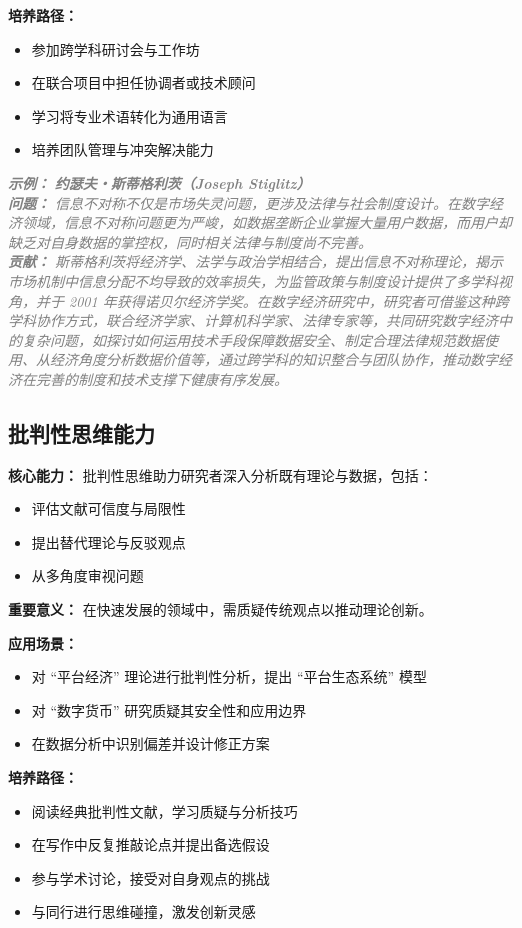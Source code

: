 \documentclass[lang=cn,12pt,a4paper]{elegantpaper}
\newcommand{\skillexample}[1]{\smallskip\noindent\textcolor{gray}{\textit{\footnotesize\textbf{示例：}} \textit{\footnotesize #1}}}
\begin{document}
\textbf {培养路径：}
\begin {itemize}
\item 参加跨学科研讨会与工作坊
\item 在联合项目中担任协调者或技术顾问
\item 学习将专业术语转化为通用语言
\item 培养团队管理与冲突解决能力
\end {itemize}

\skillexample {
\textbf {约瑟夫・斯蒂格利茨（Joseph Stiglitz）}\\
\textbf {问题：} 信息不对称不仅是市场失灵问题，更涉及法律与社会制度设计。在数字经济领域，信息不对称问题更为严峻，如数据垄断企业掌握大量用户数据，而用户却缺乏对自身数据的掌控权，同时相关法律与制度尚不完善。\\
\textbf {贡献：} 斯蒂格利茨将经济学、法学与政治学相结合，提出信息不对称理论，揭示市场机制中信息分配不均导致的效率损失，为监管政策与制度设计提供了多学科视角，并于 2001 年获得诺贝尔经济学奖。在数字经济研究中，研究者可借鉴这种跨学科协作方式，联合经济学家、计算机科学家、法律专家等，共同研究数字经济中的复杂问题，如探讨如何运用技术手段保障数据安全、制定合理法律规范数据使用、从经济角度分析数据价值等，通过跨学科的知识整合与团队协作，推动数字经济在完善的制度和技术支撑下健康有序发展。
}

\subsection {批判性思维能力}\label {sec:critical_thinking}
\textbf {核心能力：} 批判性思维助力研究者深入分析既有理论与数据，包括：
\begin {itemize}
\item 评估文献可信度与局限性
\item 提出替代理论与反驳观点
\item 从多角度审视问题
\end {itemize}

\textbf {重要意义：} 在快速发展的领域中，需质疑传统观点以推动理论创新。

\textbf {应用场景：}
\begin {itemize}
\item 对 “平台经济” 理论进行批判性分析，提出 “平台生态系统” 模型
\item 对 “数字货币” 研究质疑其安全性和应用边界
\item 在数据分析中识别偏差并设计修正方案
\end {itemize}

\textbf {培养路径：}
\begin {itemize}
\item 阅读经典批判性文献，学习质疑与分析技巧
\item 在写作中反复推敲论点并提出备选假设
\item 参与学术讨论，接受对自身观点的挑战
\item 与同行进行思维碰撞，激发创新灵感
\end {itemize}
\end{document}
